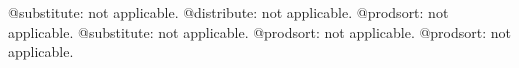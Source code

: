 \documentclass[11pt]{article}
\begin{document}
@substitute: not applicable.
@distribute: not applicable.
@prodsort: not applicable.
@substitute: not applicable.
@prodsort: not applicable.
@prodsort: not applicable.
\end{document}
